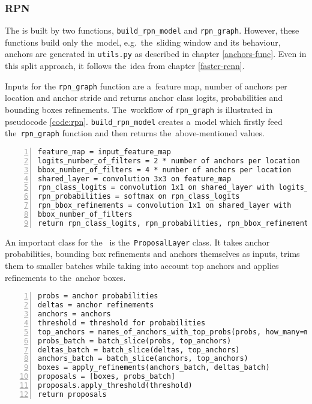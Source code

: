 \subsubsection{RPN}
\label{model-rpn}

The  is built by two functions, \verb|build_rpn_model| and 
\verb|rpn_graph|. However, these functions build only the~model,
e.g.~the~sliding window and its behaviour, anchors are generated in \verb|utils.py| as 
described in chapter \ref{anchors-func}. Even in this split approach, it 
follows the~idea from chapter \ref{faster-rcnn}.

Inputs for the \verb|rpn_graph| function are a~feature map, number of anchors
per location and anchor stride and returns anchor class logits, probabilities
and bounding boxes refinements. The~workflow of \verb|rpn_graph| is illustrated
in pseudocode \ref{code:rpn}. \verb|build_rpn_model| creates a~model which
firstly feed the~\verb|rpn_graph| function and then returns the~above-mentioned
values.

{\scriptsize
\begin{lstlisting}[style=python, caption={rpn\_graph}, captionpos=b, 
label=code:rpn, deletekeywords={from, input, map},
backgroundcolor = \color{light-gray}, numbers=left, breaklines=true]
feature_map = input_feature_map
logits_number_of_filters = 2 * number of anchors per location
bbox_number_of_filters = 4 * number of anchors per location
shared_layer = convolution 3x3 on feature_map
rpn_class_logits = convolution 1x1 on shared_layer with logits_number_of_filters
rpn_probabilities = softmax on rpn_class_logits
rpn_bbox_refinements = convolution 1x1 on shared_layer with 
bbox_number_of_filters 
return rpn_class_logits, rpn_probabilities, rpn_bbox_refinements
\end{lstlisting}}

An important class for the~ is the~\verb|ProposalLayer| class. It takes 
anchor probabilities, bounding box refinements and anchors themselves as inputs, 
trims them to smaller batches while taking into account top anchors and applies 
refinements to the~anchor boxes.

{\scriptsize
\begin{lstlisting}[style=python, caption={ProposalLayer}, captionpos=b, 
label=code:prop-layer, deletekeywords={from, input, map, for},
backgroundcolor = \color{light-gray}, numbers=left, breaklines=true]
probs = anchor probabilities
deltas = anchor refinements
anchors = anchors
threshold = threshold for probabilities
top_anchors = names_of_anchors_with_top_probs(probs, how_many=min(6000, len(probs)))
probs_batch = batch_slice(probs, top_anchors)
deltas_batch = batch_slice(deltas, top_anchors)
anchors_batch = batch_slice(anchors, top_anchors)
boxes = apply_refinements(anchors_batch, deltas_batch)
proposals = [boxes, probs_batch]
proposals.apply_threshold(threshold)
return proposals
\end{lstlisting}}

